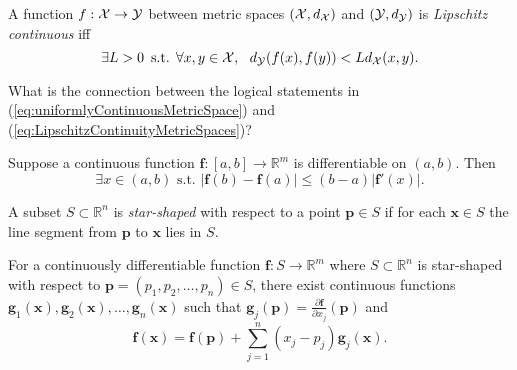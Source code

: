 \begin{defn}
  \label{def:LipschitzContinuityMetricSpaces}
  A function $f: {\cal X} \rightarrow {\cal Y}$ between
  metric spaces $({\cal X},d_{\cal X})$ and $({\cal Y}, d_{\cal Y})$ 
  is \emph{Lipschitz continuous} iff
  \begin{equation}
    \label{eq:LipschitzContinuityMetricSpaces}
    \exists L>0\, \text{ s.t. }
     \forall x,y \in {\cal X}, \ \ 
    d_{\cal Y}(f(x),f(y)) < L d_{\cal X}(x,y). 
  \end{equation}
\end{defn}

\begin{exc}
  What is the connection between the logical statements
  in (\ref{eq:uniformlyContinuousMetricSpace})
  and (\ref{eq:LipschitzContinuityMetricSpaces})? 
\end{exc}

\begin{thm}
  \label{thm:vectorMeanValue}
  Suppose a continuous function $\mathbf{f}: [a,b]\rightarrow \mathbb{R}^m$
  is differentiable on $(a,b)$. Then 
  \begin{equation}
    \label{eq:vectorMeanValue}
    \exists x\in(a,b) \text{ s.t. }
    |\mathbf{f}(b)-\mathbf{f}(a)|\le (b-a)|\mathbf{f}'(x)|.
  \end{equation}
\end{thm}

\begin{defn}
  \label{def:starShapedSet}
  A subset $S\subset \mathbb{R}^n$ is \emph{star-shaped} with
  respect to a point $\mathbf{p}\in S$ if for each $\mathbf{x}\in S$
  the line segment from $\mathbf{p}$ to $\mathbf{x}$ lies in $S$.
\end{defn}

\begin{thm}
  \label{thm:meanValueVectorSimilar}
  For a continuously differentiable function
  $\mathbf{f}: S\rightarrow \mathbb{R}^m$
  where $S\subset \mathbb{R}^n$
  is star-shaped with respect to $\mathbf{p}=(p_1,p_2,\ldots,p_n)\in S$, 
  there exist continuous functions
  $\mathbf{g}_1(\mathbf{x}),
  \mathbf{g}_2(\mathbf{x}), \ldots, \mathbf{g}_n(\mathbf{x})$
  such that
  $\mathbf{g}_j(\mathbf{p}) = \frac{\partial \mathbf{f}}{\partial x_j}(\mathbf{p})$
  and 
  \begin{equation}
    \label{eq:meanValueVectorSimilar}
    \mathbf{f}(\mathbf{x}) = \mathbf{f}(\mathbf{p})
    + \sum_{j=1}^n(x_j-p_j) \mathbf{g}_j(\mathbf{x}). 
  \end{equation}
\end{thm}

